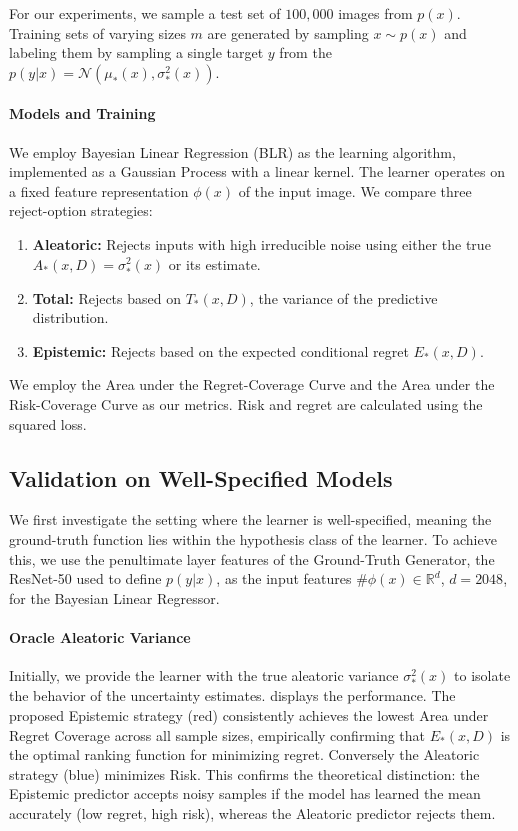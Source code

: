 For our experiments, we sample a test set of $100,000$ images from $p(x)$. Training sets of varying sizes $m$ are generated by sampling $x \sim p(x)$ and labeling them by sampling a single target $y$ from the $p(y|x)=\mathcal{N}(\mu_*(x), \sigma^{2}_*(x))$.

\paragraph{Models and Training} We employ Bayesian Linear Regression (BLR) as the learning algorithm, implemented as a Gaussian Process with a linear kernel. The learner operates on a fixed feature representation $\phi(x)$ of the input image. We compare three reject-option strategies:
\begin{enumerate}
    \item \textbf{Aleatoric:} Rejects inputs with high irreducible noise using either the true $A_*(x, D)=\sigma_*^2(x)$ or its estimate.
    \item \textbf{Total:} Rejects based on $T_*(x, D)$, the variance of the predictive distribution.
    \item \textbf{Epistemic:} Rejects based on the expected conditional regret $E_*(x, D)$.
\end{enumerate}
    
We employ the Area under the Regret-Coverage Curve and the Area under the Risk-Coverage Curve as our metrics. Risk and regret are calculated using the squared loss.

\subsection{Validation on Well-Specified Models}
We first investigate the setting where the learner is well-specified, meaning the ground-truth function lies within the hypothesis class of the learner. To achieve this, we use the penultimate layer features of the Ground-Truth Generator, the ResNet-50 used to define $p(y|x)$, as the input features $\#\phi(x)\in\mathbb{R}^d$, $d=2048$, for the Bayesian Linear Regressor.

\paragraph{Oracle Aleatoric Variance} Initially, we provide the learner with the true aleatoric variance $\sigma^{2}_*(x)$ to isolate the behavior of the uncertainty estimates.  displays the performance. The proposed Epistemic strategy (red) consistently achieves the lowest Area under Regret Coverage across all sample sizes, empirically confirming that $E_*(x, D)$ is the optimal ranking function for minimizing regret. Conversely the Aleatoric strategy (blue) minimizes Risk. This confirms the theoretical distinction: the Epistemic predictor accepts noisy samples if the model has learned the mean accurately (low regret, high risk), whereas the Aleatoric predictor rejects them.

